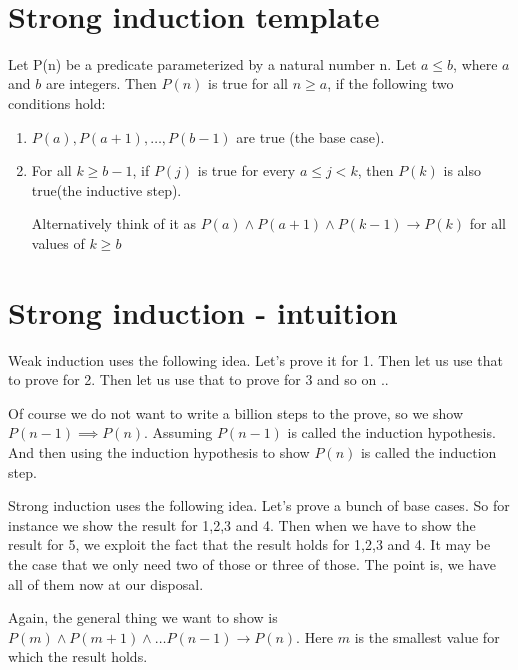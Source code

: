 \documentclass[12pt]{article}
\begin{document}
\begin{center}
\\
\vspace{1cm}
\end{center}


\section*{Strong induction template}
Let P(n) be a predicate parameterized by a natural number n. Let $a \le b$, where $a$ and $b$ are integers. Then $P(n)$ is true for all $n \ge a$, if the following two conditions hold:

\begin{enumerate}
\item $P(a), P(a+1), \ldots ,P(b-1)$ are true (the base case).

\item For all $k \ge b-1$, if $P(j)$ is true for every $a \le j < k$, then $P(k)$ is also true(the inductive step). 

Alternatively think of it as $P(a) \wedge P(a+1) \wedge P(k-1) \rightarrow P(k)$  for all values of $k \ge b$ 

\end{enumerate}

\section*{Strong induction - intuition}

Weak induction uses the following idea. Let's prove it for 1. Then let us use that to prove for 2. Then let us use that to prove for 3 and so on ..

Of course we do not want to write a billion steps to the prove, so we show $P(n-1) \implies P(n)$.
Assuming $P(n-1)$ is called the induction hypothesis. And then using the induction hypothesis to show $P(n)$ is called the induction step.

Strong induction uses the following idea. Let's prove a bunch of base cases. So for instance we show the result for 1,2,3 and 4. Then when we have to show the result for 5, we exploit the fact that the result holds for 1,2,3 and 4. It may be the case that we only need two of those or three of those. The point is, we have all of them now at our disposal.

Again, the general thing we want to show is $P(m) \wedge P(m+1) \wedge \ldots P(n-1) \rightarrow P(n)$. Here $m$ is the smallest value for which the result holds. 
\end{document}

